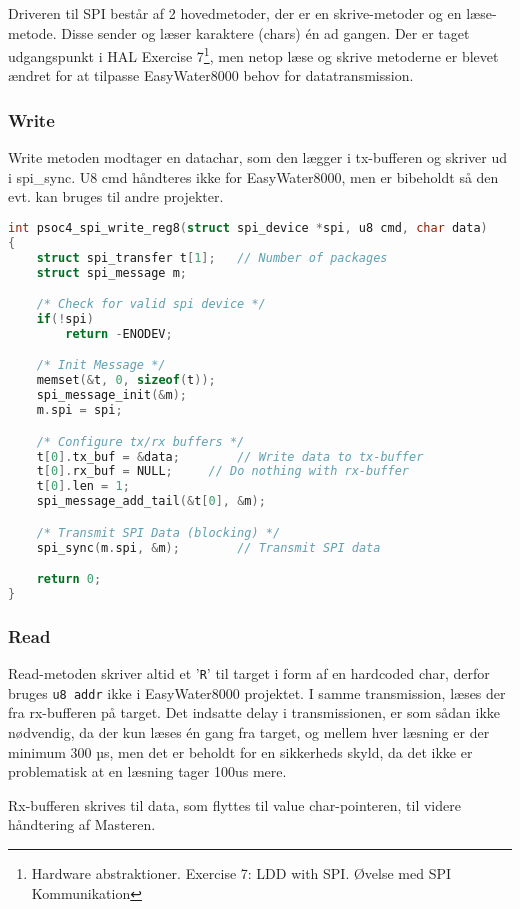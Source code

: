 
Driveren til SPI består af 2 hovedmetoder, der er en skrive-metoder og en læse-metode. Disse sender og læser karaktere (chars) én ad gangen. Der er taget udgangspunkt i HAL Exercise 7\footnote{Hardware abstraktioner. Exercise 7: LDD with SPI. Øvelse med SPI Kommunikation}, men netop læse og skrive metoderne er blevet ændret for at tilpasse EasyWater8000 behov for datatransmission.

\subsubsection*{Write}

Write metoden modtager en datachar, som den lægger i tx-bufferen og skriver ud i spi\_sync. 
U8 cmd håndteres ikke for EasyWater8000, men er bibeholdt så den evt. kan bruges til andre projekter.

\begin{lstlisting}[language=C]
int psoc4_spi_write_reg8(struct spi_device *spi, u8 cmd, char data)
{
	struct spi_transfer t[1];	// Number of packages
	struct spi_message m;

	/* Check for valid spi device */
	if(!spi)
		return -ENODEV;

	/* Init Message */
	memset(&t, 0, sizeof(t)); 
	spi_message_init(&m);
	m.spi = spi;

	/* Configure tx/rx buffers */
	t[0].tx_buf = &data;		// Write data to tx-buffer
	t[0].rx_buf = NULL;		// Do nothing with rx-buffer
	t[0].len = 1;			
	spi_message_add_tail(&t[0], &m);

	/* Transmit SPI Data (blocking) */
	spi_sync(m.spi, &m);		// Transmit SPI data

	return 0;
}
\end{lstlisting}

\subsubsection*{Read}

Read-metoden skriver altid et '\verb+R+' til target i form af en hardcoded char, derfor bruges \verb+u8 addr+ ikke i EasyWater8000 projektet. I samme transmission, læses der fra rx-bufferen på target. Det indsatte delay i transmissionen, er som sådan ikke nødvendig, da der kun læses én gang fra target, og mellem hver læsning er der minimum 300 µs, men det er beholdt for en sikkerheds skyld, da det ikke er problematisk at en læsning tager 100us mere.

Rx-bufferen skrives til data, som flyttes til value char-pointeren, til videre håndtering af Masteren.


